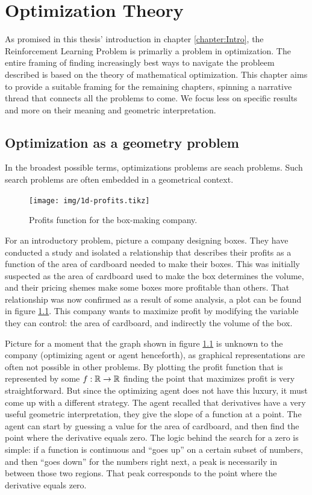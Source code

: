 \chapter{Optimization Theory}
\label{chapter:OptimizationTheory}

As promised in this thesis' introduction in chapter \ref{chapter:Intro}, the
Reinforcement Learning Problem is primarliy a problem in optimization. The
entire framing of finding increasingly best ways to navigate the probleem
described is based on the theory of mathematical optimization. This chapter aims
to provide a suitable framing for the remaining chapters, spinning a narrative
thread that connects all the problems to come. We focus less on specific results
and more on their meaning and geometric interpretation.

\section{Optimization as a geometry problem}

In the broadest possible terms, optimizations problems are seach problems. Such
search problems are often embedded in a geometrical context.

\begin{figure}
   \centering
   \texttt{[image: img/1d-profits.tikz]} 
   \caption{Profits function for the box-making company.}
   \label{fig:1d-profits}
\end{figure}

For an introductory problem, picture a company designing boxes. They have
conducted a study and isolated a relationship that describes their profits as a
function of the area of cardboard needed to make their boxes. This was initially
suspected as the area of cardboard used to make the box determines the volume,
and their pricing shemes make some boxes more profitable than others. That
relationship was now confirmed as a result of some analysis, a plot can be found
in figure \ref{fig:1d-profits}. This company wants to maximize profit by
modifying the variable they can control: the area of cardboard, and indirectly
the volume of the box.

Picture for a moment that the graph shown in figure \ref{fig:1d-profits} is
unknown to the company (optimizing agent or agent henceforth), as graphical
representations are often not possible in other problems. By plotting the profit
function that is represented by some $f: \mathbb{R} \to \mathbb{R}$ finding the point that
maximizes profit is very straightforward. But since the optimizing agent does
not have this luxury, it must come up with a different strategy. The agent
recalled that derivatives have a very useful geometric interpretation, they give
the slope of a function at a point. The agent can start by guessing a value for
the area of cardboard, and then find the point where the derivative equals zero.
The logic behind the search for a zero is simple: if a function is continuous
and ``goes up'' on a certain subset of numbers, and then ``goes down'' for the
numbers right next, a peak is necessarily in between those two regions. That
peak corresponds to the point where the derivative equals zero.

